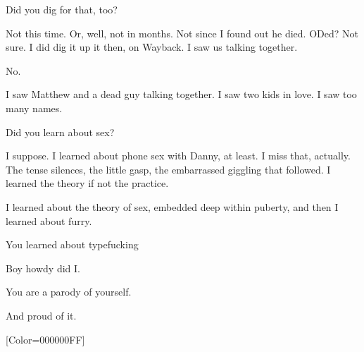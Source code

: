 \begin{paracol}{2}
\begin{leftcolumn}
\begin{ally}
Did you dig for that, too?
\end{ally}
Not this time. Or, well, not in months. Not since I found out he died. ODed? Not sure. I did dig it up it then, on Wayback. I saw us talking together.

No.

I saw Matthew and a dead guy talking together. I saw two kids in love. I saw too many names.

\begin{ally}
Did you learn about sex?
\end{ally}
I suppose. I learned about phone sex with Danny, at least. I miss that, actually. The tense silences, the little gasp, the embarrassed giggling that followed. I learned the theory if not the practice.

I learned about the theory of sex, embedded deep within puberty, and then I learned about furry.

\begin{ally}
You learned about typefucking
\end{ally}
Boy howdy did I.

\begin{ally}
You are a parody of yourself.
\end{ally}
And proud of it.
\newpage
\end{leftcolumn}
\end{paracol}

\resetbackgroundcolor
\renewfontfamily{}[Color=000000FF]

